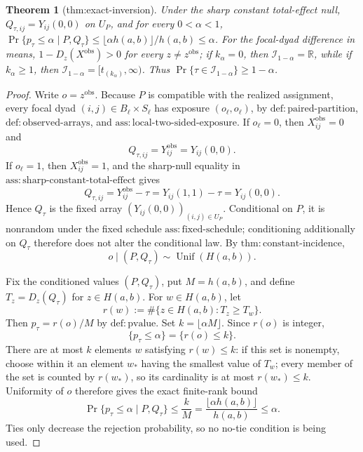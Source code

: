 \documentclass{article}
\newtheorem{theorem}{Theorem}
\begin{document}
\begin{theorem}[thm:exact-inversion]\label{thm:exact-inversion}
Under the sharp constant total-effect null, \(Q_{\tau,ij}=Y_{ij}(0,0)\) on \(U_P\), and for every \(0<\alpha<1\), \(\Pr\{p_\tau\le\alpha\mid P,Q_\tau\}\le\lfloor\alpha h(a,b)\rfloor/h(a,b)\le\alpha\). For the focal-dyad difference in means, \(1-D_z(X^{\mathrm{obs}})>0\) for every \(z\ne z^{\mathrm{obs}}\); if \(k_\alpha=0\), then \(\mathcal I_{1-\alpha}=\mathbb R\), while if \(k_\alpha\ge1\), then \(\mathcal I_{1-\alpha}=[t_{(k_\alpha)},\infty)\). Thus \(\Pr\{\tau\in\mathcal I_{1-\alpha}\}\ge1-\alpha\).
\end{theorem}
\begin{proof}
Write \(o=z^{\mathrm{obs}}\).  Because \(P\) is compatible with the realized assignment, every focal dyad \((i,j)\in B_\ell\times S_\ell\) has exposure \((o_\ell,o_\ell)\), by \(\mathrm{def{:}paired\mbox{-}partition}\), \(\mathrm{def{:}observed\mbox{-}arrays}\), and \(\mathrm{ass{:}local\mbox{-}two\mbox{-}sided\mbox{-}exposure}\).  If \(o_\ell=0\), then \(X_{ij}^{\mathrm{obs}}=0\) and
\[
 Q_{\tau,ij}=Y_{ij}^{\mathrm{obs}}=Y_{ij}(0,0).
\]
If \(o_\ell=1\), then \(X_{ij}^{\mathrm{obs}}=1\), and the sharp-null equality in \(\mathrm{ass{:}sharp\mbox{-}constant\mbox{-}total\mbox{-}effect}\) gives
\[
 Q_{\tau,ij}=Y_{ij}^{\mathrm{obs}}-\tau
 =Y_{ij}(1,1)-\tau
 =Y_{ij}(0,0).
\]
Hence \(Q_\tau\) is the fixed array \((Y_{ij}(0,0))_{(i,j)\in U_P}\).  Conditional on \(P\), it is nonrandom under the fixed schedule \(\mathrm{ass{:}fixed\mbox{-}schedule}\); conditioning additionally on \(Q_\tau\) therefore does not alter the conditional law.  By \(\mathrm{thm{:}constant\mbox{-}incidence}\),
\[
 o\mid(P,Q_\tau)\sim\operatorname{Unif}(H(a,b)).
\]

Fix the conditioned values \((P,Q_\tau)\), put \(M=h(a,b)\), and define \(T_z=D_z(Q_\tau)\) for \(z\in H(a,b)\).  For \(w\in H(a,b)\), let
\[
 r(w):=\#\{z\in H(a,b):T_z\ge T_w\}.
\]
Then \(p_\tau=r(o)/M\) by \(\mathrm{def{:}pvalue}\).  Set \(k=\lfloor\alpha M\rfloor\).  Since \(r(o)\) is integer,
\[
 \{p_\tau\le\alpha\}=\{r(o)\le k\}.
\]
There are at most \(k\) elements \(w\) satisfying \(r(w)\le k\): if this set is nonempty, choose within it an element \(w_*\) having the smallest value of \(T_w\); every member of the set is counted by \(r(w_*)\), so its cardinality is at most \(r(w_*)\le k\).  Uniformity of \(o\) therefore gives the exact finite-rank bound
\[
 \Pr\{p_\tau\le\alpha\mid P,Q_\tau\}
 \le \frac{k}{M}
 =\frac{\lfloor\alpha h(a,b)\rfloor}{h(a,b)}
 \le\alpha.
\]
Ties only decrease the rejection probability, so no no-tie condition is being used.


\end{proof}
\end{document}
